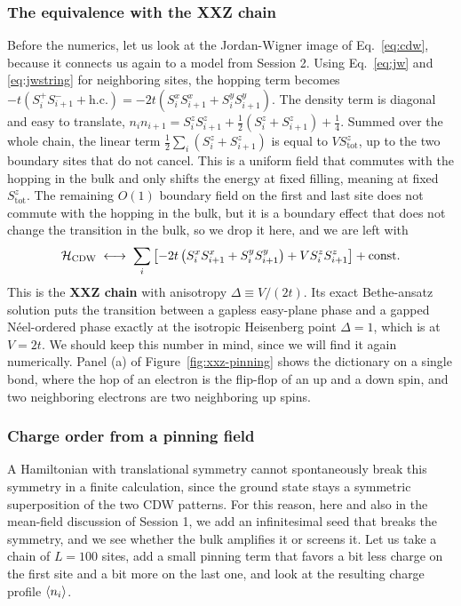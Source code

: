\documentclass[lecture_notes.tex]{subfiles}
\begin{document}
\subsubsection{The equivalence with the XXZ chain}
Before the numerics, let us look at the Jordan-Wigner image of Eq.~\eqref{eq:cdw}, because it
connects us again to a model from Session 2. Using Eq.~\eqref{eq:jw} and \eqref{eq:jwstring} for
neighboring sites, the hopping term becomes
$-t(S_i^+S_{i+1}^-+\mathrm{h.c.}) = -2t(S_i^xS_{i+1}^x+S_i^yS_{i+1}^y)$. The density term is
diagonal and easy to translate, $n_in_{i+1} = S_i^zS_{i+1}^z + \tfrac12(S_i^z+S_{i+1}^z) +
\tfrac14$. Summed over the whole chain, the linear term $\tfrac12\sum_i(S_i^z+S_{i+1}^z)$ is equal
to $VS_{\mathrm{tot}}^z$, up to the two boundary sites that do not cancel. This is a uniform field
that commutes with the hopping in the bulk and only shifts the energy at fixed filling, meaning at
fixed $S_{\mathrm{tot}}^z$. The remaining $O(1)$ boundary field on the first and last site does not
commute with the hopping in the bulk, but it is a boundary effect that does not change the
transition in the bulk, so we drop it here, and we are left with
\begin{equation}
  \mathcal{H}_{\mathrm{CDW}} \;\longleftrightarrow\;
  \sum_i\left[-2t\left(S_i^xS_{i+1}^x+S_i^yS_{i+1}^y\right) + V S_i^zS_{i+1}^z\right] + \mathrm{const.}
  \label{eq:xxzferm}
\end{equation}
This is the \textbf{XXZ chain} with anisotropy $\Delta \equiv V/(2t)$. Its exact
Bethe-ansatz solution puts the transition between a gapless easy-plane phase and a gapped
N\'eel-ordered phase exactly at the isotropic Heisenberg point $\Delta=1$, which is at $V=2t$. We
should keep this number in mind, since we will find it again numerically. Panel (a) of
Figure~\ref{fig:xxz-pinning} shows the dictionary on a single bond, where the hop of an electron is
the flip-flop of an up and a down spin, and two neighboring electrons are two neighboring up spins.

\subsubsection{Charge order from a pinning field}
A Hamiltonian with translational symmetry cannot spontaneously break this symmetry in a finite
calculation, since the ground state stays a symmetric superposition of the two CDW patterns. For
this reason, here and also in the mean-field discussion of Session 1, we add an infinitesimal seed
that breaks the symmetry, and we see whether the bulk amplifies it or screens it. Let us take a
chain of $L=100$ sites, add a small pinning term that favors a bit less charge on the first site
and a bit more on the last one, and look at the resulting charge profile $\expval{n_i}$.
\end{document}
